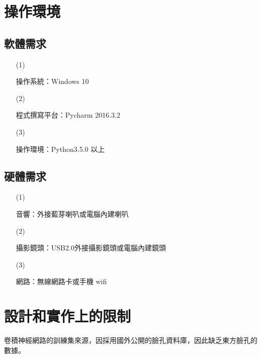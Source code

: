 \documentclass[12pt]{scrreprt}
\begin{document}
\section{操作環境}

\subsection{軟體需求}
\begin{itemize}
\item[(1)]{\begin{bfseries}{操作系統：}Windows 10\end{bfseries}}
\item[(2)]{\begin{bfseries}{程式撰寫平台：}Pycharm 2016.3.2\end{bfseries}}
\item[(3)]{\begin{bfseries}{操作環境：}Python3.5.0 以上\end{bfseries}}
\end{itemize}

\subsection{硬體需求}
\begin{itemize}
\item[(1)]{\begin{bfseries}{音響：}外接藍芽喇叭或電腦內建喇叭\end{bfseries}}
\item[(2)]{\begin{bfseries}{攝影鏡頭：}USB2.0外接攝影鏡頭或電腦內建鏡頭\end{bfseries}}
\item[(3)]{\begin{bfseries}{網路：}無線網路卡或手機 wifi\end{bfseries}}
\end{itemize}

\section{設計和實作上的限制}
卷積神經網路的訓練集來源，因採用國外公開的臉孔資料庫，因此缺乏東方臉孔的數據。
\end{document}
